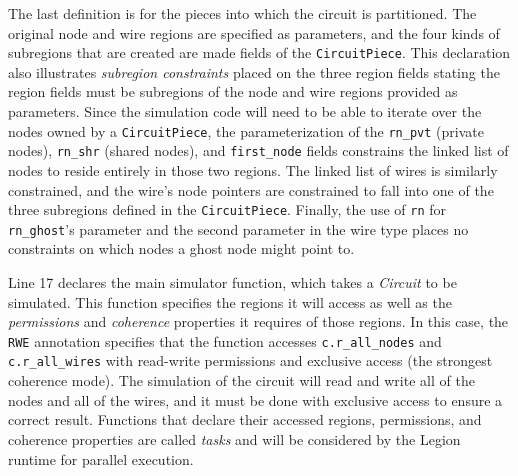 The last definition is for the pieces into which the circuit is partitioned.
The original node and wire regions are specified as parameters, and the
four kinds of subregions that are created are made fields of the
{\tt CircuitPiece}.  This declaration also illustrates {\em subregion constraints}
placed on the three region fields stating the region fields  must be subregions of the 
node and wire regions provided as parameters.  Since the simulation code will need to be able to
iterate over the nodes owned by a {\tt CircuitPiece}, the parameterization of the {\tt rn\_pvt} (private nodes),
{\tt rn\_shr} (shared nodes), and {\tt first\_node} fields constrains the linked list of
nodes to reside entirely in those two regions.  The linked list of wires is
similarly constrained, and the wire's node pointers are constrained to fall
into one of the three subregions defined in the {\tt CircuitPiece}.  Finally,
the use of {\tt rn} for {\tt rn\_ghost}'s parameter and the second parameter
in the wire type places no constraints on which nodes a ghost node might point
to.

Line 17 declares the main simulator function, which takes a
\emph{Circuit} to be simulated.  This function specifies the regions it
will access as well as the {\em permissions} and {\em coherence}
properties it requires of those regions.  In this case, the {\tt RWE}
annotation specifies that the function accesses {\tt c.r\_all\_nodes}
and {\tt c.r\_all\_wires} with read-write permissions and exclusive
access (the strongest coherence mode).  The simulation of the circuit
will read and write all of the nodes and all of the wires, and it must
be done with exclusive access to ensure a correct result.  Functions that
declare their accessed regions, permissions, and coherence properties are
called {\em tasks} and will be considered by the Legion runtime for parallel
execution.

%

